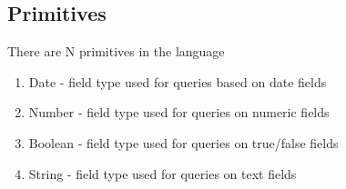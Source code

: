 \subsection{Primitives}
There are N primitives in the language
\begin{enumerate}
\item Date - field type used for queries based on date fields
\item Number - field type used for queries on numeric fields
\item Boolean - field type used for queries on true/false fields
\item String - field type used for queries on text fields
\end{enumerate}